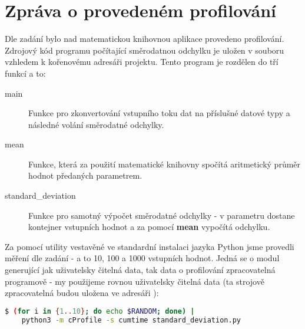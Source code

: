 \documentclass[11pt,a4paper,titlepage]{extarticle}
\begin{document}
\pagestyle{fancy}
\section{Zpráva o provedeném profilování}
Dle zadání bylo nad matematickou knihovnou aplikace provedeno profilování.
Zdrojový kód programu počítající směrodatnou odchylku je uložen v souboru 
vzhledem k kořenovému adresáři projektu. Tento program je rozdělen do tří funkcí a to:
\begin{description}
\item[main] Funkce pro zkonvertování vstupního toku dat na příslušné datové typy a následné volání směrodatné odchylky.
\item[mean] Funkce, která za použití matematické knihovny spočítá aritmetický průměr hodnot předaných parametrem.
\item[standard\_deviation] Funkce pro samotný výpočet směrodatné odchylky - v parametru dostane kontejner vstupních hodnot
    a za pomocí \textbf{mean} vypočítá odchylku.
\end{description}

Za pomocí utility  vestavěné ve standardní instalaci jazyka Python jsme provedli měření dle zadání - a to
 10, 100 a 1000 vstupních hodnot. Jedná se o modul generující jak uživatelsky čitelná data, tak data o profilování zpracovatelná
 programově - my použijeme rovnou uživatelsky čitelná data (ta strojově zpracovatelná budou uložena ve adresáři ):
\begin{lstlisting}[language=bash]
$ (for i in {1..10}; do echo $RANDOM; done) |
    python3 -m cProfile -s cumtime standard_deviation.py

\end{lstlisting}
\end{document}
